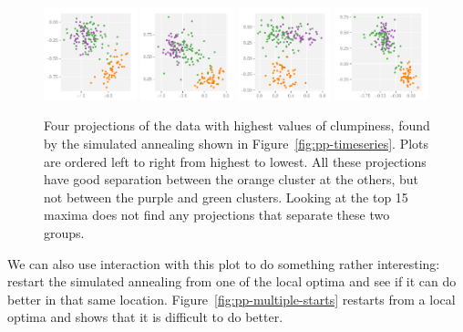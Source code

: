 \documentclass[preprint]{imsart}
\begin{document}
\begin{figure}[htbp]
  \centering
  \includegraphics[width=0.24\textwidth]{proj-1}
  \includegraphics[width=0.24\textwidth]{proj-2}
  \includegraphics[width=0.24\textwidth]{proj-3}
  \includegraphics[width=0.24\textwidth]{proj-4}
  \caption{Four projections of the data with highest values of clumpiness, found by the simulated annealing shown in Figure~\ref{fig:pp-timeseries}.  Plots are ordered left to right from highest to lowest.  All these projections have good separation between the orange cluster at the others, but not between the purple and green clusters.  Looking at the top 15 maxima does not find any projections that separate these two groups.  }
  \label{fig:pp-peaks}
\end{figure}

We can also use interaction with this plot to do something rather interesting: restart the simulated annealing from one of the local optima and see if it can do better in that same location.  Figure~\ref{fig:pp-multiple-starts} restarts from a local optima and shows that it is difficult to do better.
\end{document}
